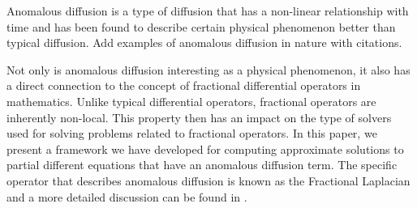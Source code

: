 Anomalous diffusion is a type of diffusion that has a non-linear relationship with time and has been found to describe certain physical phenomenon better than typical diffusion. {\color{blue} Add examples of anomalous diffusion in nature with citations. } 

Not only is anomalous diffusion interesting as a physical phenomenon, it also has a direct connection to the concept of fractional differential operators in mathematics. Unlike typical differential operators, fractional operators are inherently non-local. This property then has an impact on the type of solvers used for solving problems related to fractional operators. In this paper, we present a framework we have developed for computing approximate solutions to partial different equations that have an anomalous diffusion term. The specific operator that describes anomalous diffusion is known as the Fractional Laplacian and a more detailed discussion can be found in \cite{flaplacian}.